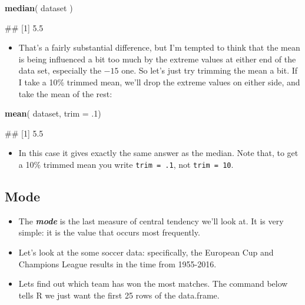 \documentclass[
]{book}
\newenvironment{Shaded}{\begin{snugshade}}{\end{snugshade}}
\newcommand{\AttributeTok}[1]{\textcolor[rgb]{0.13,0.29,0.53}{#1}}
\newcommand{\DecValTok}[1]{\textcolor[rgb]{0.00,0.00,0.81}{#1}}
\newcommand{\FunctionTok}[1]{\textcolor[rgb]{0.13,0.29,0.53}{\textbf{#1}}}
\newcommand{\NormalTok}[1]{#1}
\providecommand{\tightlist}{%
  \setlength{\itemsep}{0pt}\setlength{\parskip}{0pt}}
\begin{document}
\begin{Shaded}
\begin{Highlighting}[]
\FunctionTok{median}\NormalTok{( dataset )}
\end{Highlighting}
\end{Shaded}

\begin{Shaded}
\begin{Highlighting}[]
\NormalTok{\#\# [1] 5.5}
\end{Highlighting}
\end{Shaded}

\begin{itemize}
\tightlist
\item
  That's a fairly substantial difference, but I'm tempted to think that the mean is being influenced a bit too much by the extreme values at either end of the data set, especially the \(-15\) one. So let's just try trimming the mean a bit. If I take a 10\% trimmed mean, we'll drop the extreme values on either side, and take the mean of the rest:
\end{itemize}

\begin{Shaded}
\begin{Highlighting}[]
\FunctionTok{mean}\NormalTok{( dataset, }\AttributeTok{trim =}\NormalTok{ .}\DecValTok{1}\NormalTok{)}
\end{Highlighting}
\end{Shaded}

\begin{Shaded}
\begin{Highlighting}[]
\NormalTok{\#\# [1] 5.5}
\end{Highlighting}
\end{Shaded}

\begin{itemize}
\tightlist
\item
  In this case it gives exactly the same answer as the median. Note that, to get a 10\% trimmed mean you write \texttt{trim\ =\ .1}, not \texttt{trim\ =\ 10}.
\end{itemize}

\subsection{Mode}\label{mode}

\begin{itemize}
\item
  The \textbf{\emph{mode}} is the last measure of central tendency we'll look at. It is very simple: it is the value that occurs most frequently.
\item
  Let's look at the some soccer data: specifically, the European Cup and Champions League results in the time from 1955-2016.
\item
  Lets find out which team has won the most matches. The command below tells R we just want the first 25 rows of the data.frame.
\end{itemize}
\end{document}
